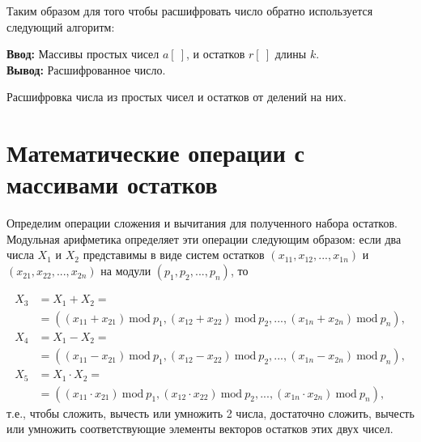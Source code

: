\documentclass[10pt]{article}
\begin{document}
Таким образом для того чтобы расшифровать число обратно используется следующий алгоритм:

\begin{algorithm}[H]
	\textbf{Ввод:} Массивы простых чисел $a[~]$, и остатков $r[~]$ длины $k$.\\
	\textbf{Вывод:} Расшифрованное число.
	\begin{algorithmic}
	\end{algorithmic}
	\caption{Расшифровка числа из простых чисел и остатков от делений на них.}
	\label{algo:crt_decription}
\end{algorithm}


\section{Математические операции с массивами остатков}

Определим операции сложения и вычитания для полученного набора остатков. Модульная арифметика \cite{omondi2007residue, soderstrand1986residue} определяет эти операции следующим образом: если два числа $X_1$ и $X_2$ представимы в виде систем остатков $(x_{11}, x_{12}, ..., x_{1n}) $ и $(x_{21}, x_{22}, ..., x_{2n})$ на модули $(p_1, p_2, ..., p_n)$, то 

\begin{align} 
	X_3 &= X_1 + X_2 = \nonumber \\ 
	    & = ((x_{11} + x_{21})\ \mathrm{mod}\ p_1, (x_{12} + x_{22})\ \mathrm{mod}\ p_2, ..., (x_{1n} + x_{2n})\ \mathrm{mod}\ p_n), \\
	X_4 &= X_1 - X_2 = \nonumber \\ 
		& =((x_{11} - x_{21})\ \mathrm{mod}\ p_1, (x_{12} - x_{22})\ \mathrm{mod}\ p_2, ..., (x_{1n} - x_{2n})\ \mathrm{mod}\ p_n), \\
	X_5 &= X_1 \cdot X_2 = \nonumber \\ 
		& = ((x_{11} \cdot x_{21})\ \mathrm{mod}\ p_1, (x_{12} \cdot x_{22})\ \mathrm{mod}\ p_2, ..., (x_{1n} \cdot x_{2n})\ \mathrm{mod}\ p_n), 
\end{align}
т.е., чтобы сложить, вычесть или умножить 2 числа, достаточно сложить, вычесть или умножить соответствующие элементы векторов остатков этих двух чисел. 
\end{document}
